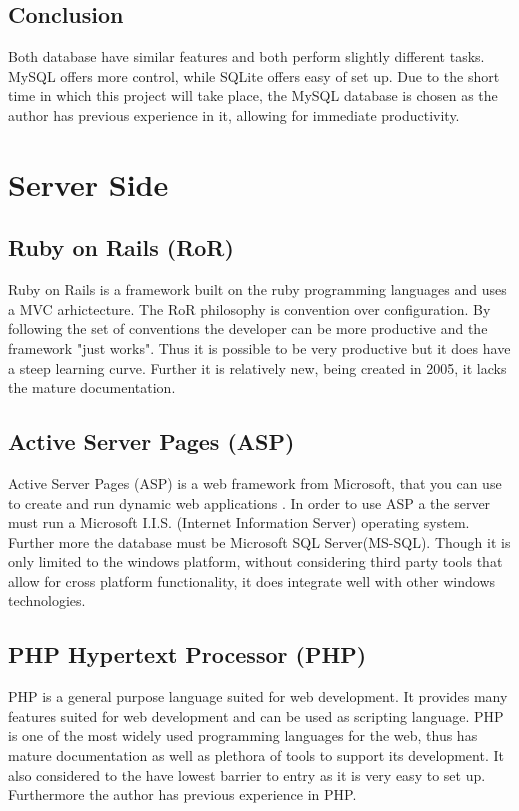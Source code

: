 \documentclass[a4paper,oneside,11pt]{report}
\begin{document}
\subsection{Conclusion}
Both database have similar features and both perform slightly different tasks. MySQL offers more control, while SQLite offers easy of set up. Due to the short time in which this project will take place, the MySQL database is chosen as the author has previous experience in it, allowing for immediate productivity.

\section{Server Side} 
\subsection{Ruby on Rails (RoR)}  
Ruby on Rails is a framework built on the ruby programming languages and uses a MVC arhictecture. The RoR philosophy is convention over configuration. By following the set of conventions the developer can be more productive and the framework "just works". Thus it is possible to be very productive but it does have a steep learning curve. Further it is relatively new, being created in 2005, it lacks the mature documentation.

\subsection{Active Server Pages (ASP)} 
 Active Server Pages (ASP) is a web framework from Microsoft, that you can use to create and run dynamic web applications \autocite{microsoftasp}. In order to use ASP a the server must run a Microsoft I.I.S. (Internet Information Server) operating system. Further more the database must be Microsoft SQL Server(MS-SQL). Though it is only limited to the windows platform, without considering third party tools that allow for cross platform functionality, it does integrate well with other windows technologies.
 
\subsection{PHP Hypertext Processor (PHP) } 
PHP is a general purpose language suited for web development. It provides many features suited for web development and can be used as scripting language. PHP is one of the most widely used programming languages for the web, thus has mature documentation as well as plethora of tools to support its development. It also considered to the have lowest barrier to entry as it is very easy to set up. Furthermore the author has previous experience in PHP.
\end{document}
